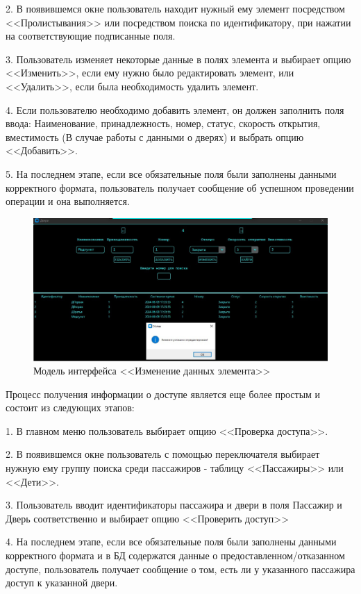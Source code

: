 2. В появившемся окне пользователь находит нужный ему элемент посредством <<Пролистывания>> или посредством поиска по идентификатору, при нажатии на соответствующие подписанные поля.

3. Пользователь изменяет некоторые данные в полях элемента и выбирает опцию <<Изменить>>, если ему нужно было редактировать элемент, или <<Удалить>>, если была необходимость удалить элемент.

4. Если пользователю необходимо добавить элемент, он должен заполнить поля ввода: Наименование, принадлежность, номер, статус, скорость открытия, вместимость (В случае работы с данными о дверях) и выбрать опцию <<Добавить>>.

5. На последнем этапе, если все обязательные поля были заполнены данными корректного формата, пользователь получает сообщение об успешном проведении операции и она выполняется.

\begin{figure} [ht]
	\centering
	\includegraphics[width=1\linewidth]{images/Example1}
	\caption{Модель интерфейса <<Изменение данных элемента>>}
	\label{fig:example1}
\end{figure}
Процесс получения информации о доступе является еще более простым и состоит из следующих этапов:

1. В главном меню пользователь выбирает опцию <<Проверка доступа>>.

2. В появившемся окне пользователь с помощью переключателя выбирает нужную ему группу поиска среди пассажиров - таблицу <<Пассажиры>> или <<Дети>>.

3. Пользователь вводит идентификаторы пассажира и двери в поля \textquotedbl Пассажир \textquotedbl и \textquotedbl Дверь \textquotedbl соответственно и выбирает опцию <<Проверить доступ>>

4. На последнем этапе, если все обязательные поля были заполнены данными корректного формата и в БД содержатся данные о предоставленном/отказанном доступе, пользователь получает сообщение о том, есть ли у указанного пассажира доступ к указанной двери.

